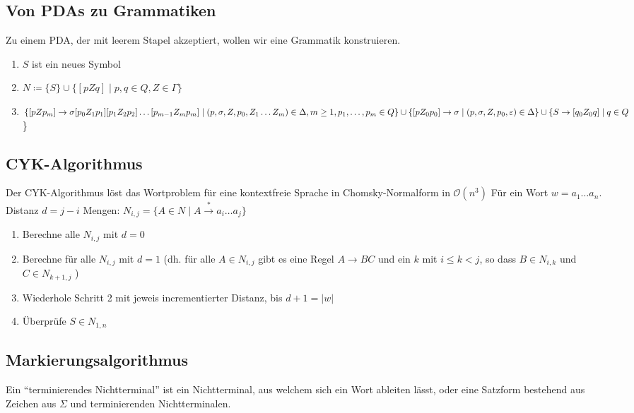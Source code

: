 \documentclass[11pt]{scrartcl}
\begin{document}
\subsection{Von PDAs zu Grammatiken}
Zu einem PDA, der mit leerem Stapel akzeptiert, wollen wir eine Grammatik konstruieren.

\begin{enumerate}
	\item $S$ ist ein neues Symbol
	\item $N \coloneqq \{S\} \cup \{[pZq] \mid p,q \in Q, Z \in \Gamma\}$
	\item $\{[pZp_m] \rightarrow \sigma[p_0Z_1p_1][p_1Z_2p_2]\ldots [p_{m-1}Z_mp_m] \mid \\ (p, \sigma, Z,p_0,Z_1\ldots Z_m) \in \Delta,  m \geq 1, p_1,\ldots,p_m \in Q\} \\ \cup \{[pZ_0p_0] \rightarrow \sigma \mid (p,\sigma,Z,p_0,\varepsilon) \in \Delta\} \\ \cup \{S \rightarrow [q_0Z_0q] \mid q \in Q$\}
\end{enumerate}

\subsection{CYK-Algorithmus}
Der CYK-Algorithmus löst das Wortproblem für eine kontextfreie Sprache in Chomsky-Normalform in $\mathcal{O}(n^3)$
Für ein Wort $w = a_1\ldots a_n$. \\
Distanz $d = j-i$ Mengen: $N_{i,j} = \{A \in N\mid A \stackrel{\ast}{\rightarrow} a_i\ldots a_j\}$
\begin{enumerate}
	\item Berechne alle $N_{i,j}$ mit $d=0$
    \item Berechne für alle $N_{i,j}$ mit $d=1$ (dh. für alle $A \in N_{i,j}$ gibt es eine Regel $A \rightarrow BC$ und ein $k$ mit $i \leq k < j$, so dass $B \in N_{i,k}$ und $C \in N_{k+1,j}$ )
    \item Wiederhole Schritt 2 mit jeweis incrementierter Distanz, bis $d+1=|w|$
	\item Überprüfe $S \in N_{1,n}$
\end{enumerate}

\subsection{Markierungsalgorithmus}

Ein ``terminierendes Nichtterminal'' ist ein Nichtterminal, aus welchem sich ein Wort ableiten lässt, oder eine Satzform bestehend aus Zeichen aus $\Sigma$ und terminierenden Nichtterminalen. \\
\end{document}
